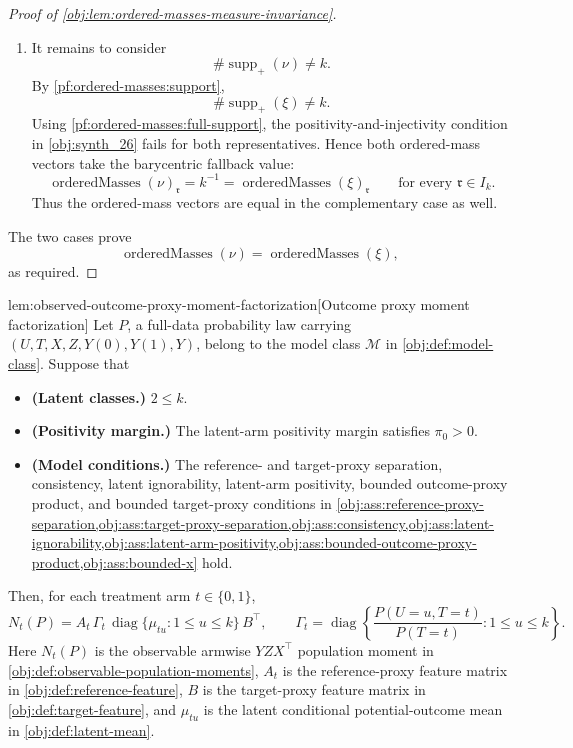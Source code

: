 \documentclass[11pt]{article}
\begin{document}
\begin{proof}[Proof of \cref{obj:lem:ordered-masses-measure-invariance}]
\begin{enumerate}
\item\label{pf:ordered-masses:fallback}
It remains to consider
\[
\#\operatorname{supp}_+(\nu)\ne k .
\]
By \cref{pf:ordered-masses:support},
\[
\#\operatorname{supp}_+(\xi)\ne k .
\]
Using \cref{pf:ordered-masses:full-support}, the positivity-and-injectivity condition in \cref{obj:synth_26} fails for both representatives.  Hence both ordered-mass vectors take the barycentric fallback value:
\[
\operatorname{orderedMasses}(\nu)_{\mathfrak r}
=
k^{-1}
=
\operatorname{orderedMasses}(\xi)_{\mathfrak r}
\qquad\text{for every }\mathfrak r\in I_k .
\]
Thus the ordered-mass vectors are equal in the complementary case as well.
\end{enumerate}

The two cases prove
\[
\operatorname{orderedMasses}(\nu)=\operatorname{orderedMasses}(\xi),
\]
as required.
\end{proof}

\begin{lemmav}{lem:observed-outcome-proxy-moment-factorization}[Outcome proxy moment factorization]
Let \(P\), a full-data probability law carrying \((U,T,X,Z,Y(0),Y(1),Y)\), belong to the model class \(\mathcal M\) in \cref{obj:def:model-class}. Suppose that
\begin{itemize}
\item \textbf{(Latent classes.)} \(2\le k\).
\item \textbf{(Positivity margin.)} The latent-arm positivity margin satisfies \(\pi_0>0\).
\item \textbf{(Model conditions.)} The reference- and target-proxy separation, consistency, latent ignorability, latent-arm positivity, bounded outcome-proxy product, and bounded target-proxy conditions in \cref{obj:ass:reference-proxy-separation,obj:ass:target-proxy-separation,obj:ass:consistency,obj:ass:latent-ignorability,obj:ass:latent-arm-positivity,obj:ass:bounded-outcome-proxy-product,obj:ass:bounded-x} hold.
\end{itemize}
Then, for each treatment arm \(t\in\{0,1\}\),
\[
N_t(P)
=
A_t\,\Gamma_t\,\operatorname{diag}\{\mu_{tu}:1\le u\le k\}\,B^\top,
\qquad
\Gamma_t
=
\operatorname{diag}\left\{\frac{P(U=u,T=t)}{P(T=t)}:1\le u\le k\right\}.
\]
Here \(N_t(P)\) is the observable armwise \(YZX^\top\) population moment in \cref{obj:def:observable-population-moments}, \(A_t\) is the reference-proxy feature matrix in \cref{obj:def:reference-feature}, \(B\) is the target-proxy feature matrix in \cref{obj:def:target-feature}, and \(\mu_{tu}\) is the latent conditional potential-outcome mean in \cref{obj:def:latent-mean}.
\end{lemmav}
\end{document}
